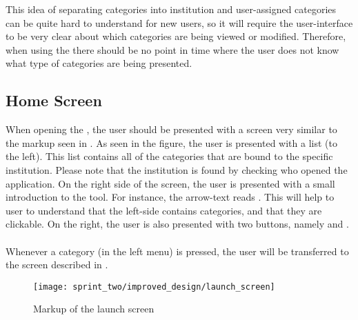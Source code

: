 This idea of separating categories into institution and user-assigned categories can be quite hard to understand for new users, so it will require the user-interface to be very clear about which categories are being viewed or modified. Therefore, when using the \ct there should be no point in time where the user does not know what type of categories are being presented.


\subsection{Home Screen}
\label{sec:home_screen}
When opening the \ct, the user should be presented with a screen very similar to the markup seen in . As seen in the figure, the user is presented with a list (to the left). This list contains all of the categories that are bound to the specific institution. Please note that the institution is found by checking who opened the application. On the right side of the screen, the user is presented with a small introduction to the tool. For instance, the arrow-text reads . This will help to user to understand that the left-side contains categories, and that they are clickable. On the right, the user is also presented with two buttons, namely  and .
\\\\
Whenever a category (in the left menu) is pressed, the user will be transferred to the screen described in .

\begin{figure}[!htbp]
    \centering
    \texttt{[image: sprint\_two/improved\_design/launch\_screen]}
    \caption{Markup of the launch screen}
    \label{fig:improved_design_launch_screen}
\end{figure}

